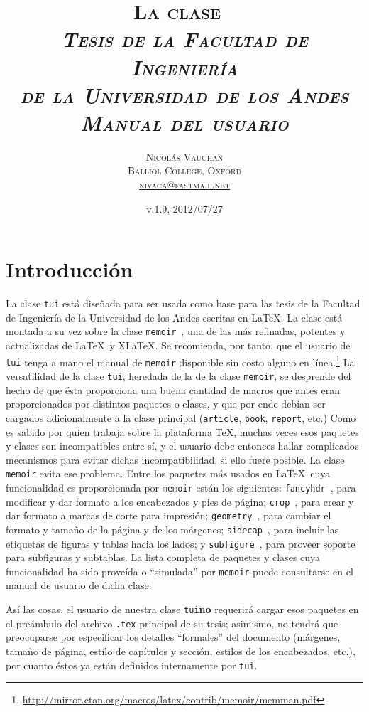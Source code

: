 \documentclass[11pt,
              article,
              oneside
              ]{memoir}
\title{\LARGE\scshape La clase\,\ \tui\\[6pt]
  \large\itshape Tesis de la Facultad de Ingeniería\\
  \large de la Universidad de los Andes\\[12pt]
 \normalsize\normalfont\scshape Manual del usuario}
\author{\normalsize\normalfont\scshape Nicolás Vaughan\\%
  \normalsize\normalfont\scshape Balliol College, Oxford\\%
  \small\url{nivaca@fastmail.net}}
\date{\normalsize\normalfont v.1.9, 2012/07/27}
\newcommand*{\paquete}[1]{\texttt{\color{NavyBlue}#1}\xspace}
\newcommand*{\tui}{{\normalfont\paquete{tui}}\xspace}
\newcommand*{\MEMOIR}{\paquete{memoir}}
\newcommand*{\XeLaTeX}{X\hspace*{-2pt}\raisebox{-2pt}{\rotatebox[origin=c]{-180}{E}}\LaTeX\xspace}
\begin{document}
\vspace*{-2cm}\maketitle
\vspace*{-1cm}
\renewcommand*{\printtoctitle}[1]{\large\bfseries\scshape #1}
\tableofcontents*


\section{Introducción}
\noindent
La clase \tui está diseñada para ser usada como base para las tesis de la Facultad de Ingeniería de la Universidad de los Andes escritas en \LaTeX. La clase está montada a su vez sobre la clase \MEMOIR~\cite{MEMOIR}, una de las más refinadas, potentes y actualizadas de \LaTeX\ y  \XeLaTeX. Se recomienda, por tanto, que el usuario de \tui tenga a mano el manual de \MEMOIR disponible sin costo alguno en línea.\footnote{\url{http://mirror.ctan.org/macros/latex/contrib/memoir/memman.pdf}} La versatilidad de la clase \tui, heredada de la de la clase \MEMOIR, se desprende del hecho de que ésta proporciona una buena cantidad de macros que antes eran proporcionados por distintos paquetes o clases, y que por ende debían ser cargados adicionalmente a la clase principal (\paquete{article}, \paquete{book}, \paquete{report}, etc.) Como es sabido por quien trabaja sobre la plataforma \TeX, muchas veces esos paquetes y clases son incompatibles entre sí, y el usuario debe entonces hallar complicados mecanismos para evitar dichas incompatibilidad, si ello fuere posible. La clase \MEMOIR evita ese problema. Entre los paquetes más usados en \LaTeX\ cuya funcionalidad es proporcionada por \MEMOIR están los siguientes: \paquete{fancyhdr}~\cite{FANCYHDR}, para modificar y dar formato a los encabezados y pies de página; \paquete{crop}~\cite{CROP}, para crear y dar formato a marcas de corte para impresión; \paquete{geometry}~\cite{GEOMETRY}, para cambiar el formato y tamaño de la página y de los márgenes; \paquete{sidecap}~\cite{SIDECAP}, para incluir las etiquetas de figuras y tablas hacia los lados; y \paquete{subfigure}~\cite{SUBFIGURE}, para proveer soporte para subfiguras y subtablas. La lista completa de paquetes y clases cuya funcionalidad ha sido proveída o \enquote{simulada} por \MEMOIR puede consultarse en el manual de usuario de dicha clase.

Así las cosas, el usuario de nuestra clase \tui \textbf{no} requerirá cargar esos paquetes en el preámbulo del archivo \texttt{.tex} principal de su tesis; asimismo, no tendrá que preocuparse por especificar los detalles \enquote{formales} del documento (márgenes, tamaño de página, estilo de capítulos y sección, estilos de los encabezados, etc.), por cuanto éstos ya están definidos internamente por \tui.
\end{document}
